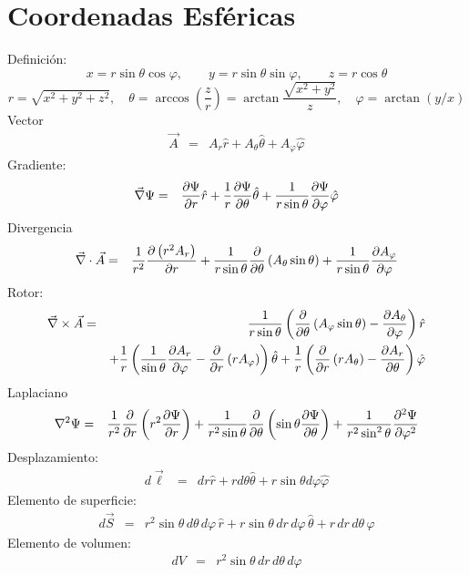 \section{Coordenadas Esféricas}
Definición:
\begin{equation}
 x = r\sin\theta\cos\varphi,\qquad 
 y = r\sin\theta\sin\varphi ,\qquad
 z = r\cos\theta 
\end{equation}
\begin{equation}
 r =\sqrt{x^2 + y^2 + z^2} ,\quad 
\theta =\arccos(\frac{z}{r}) =\arctan{\frac{\sqrt{x^2+y^2}}{z}},\quad
\varphi =\arctan{(y/x)} 
\end{equation}
Vector
\begin{eqnarray}
\vec{A} 
&=& A_r {\hat r} + A_\theta {\hat\theta} +
A_\varphi {\hat\varphi}
\end{eqnarray}
Gradiente:
\begin{eqnarray}
\vec\nabla\Psi
 &=& {\partial\Psi\over\partial r} {\hat r} 
 + {1\over r}{\partial\Psi\over\partial\theta} {\hat\theta} 
 + {1\over r\sin\theta}{\partial\Psi\over\partial\varphi} {\hat\varphi}
\end{eqnarray} 
Divergencia
\begin{eqnarray}
\vec\nabla\cdot\vec{A}
&=& {1\over r^2}{\partial\left( r^2 A_r\right)\over\partial r} 
 + {1\over r\sin\theta}{\partial\over\partial\theta}\left( 
A_\theta\sin\theta\right) 
 + {1\over r\sin\theta}{\partial A_\varphi\over\partial\varphi}
\end{eqnarray} 
Rotor:
\begin{eqnarray}
\vec\nabla\times\vec{A}
&=& {1\over r\sin\theta}\left({\partial\over\partial\theta}
\left( A_\varphi\sin\theta\right) - {\partial A_\theta\over\partial
\varphi}\right) {\hat r}\nonumber\\
&&+ {1\over r}\left({1\over\sin\theta}{\partial A_r\over\partial
\varphi} - {\partial\over\partial r}\left( r A_\varphi\right)\right)
 {\hat\theta} + {1\over r}\left({\partial\over\partial r}\left( r
A_\theta
\right) - {\partial A_r\over\partial\theta}\right) {\hat\varphi}
\end{eqnarray}
Laplaciano
\begin{eqnarray}
\nabla^2\Psi
&=& {1\over r^2}{\partial\over\partial r}\left(r^2 {\partial\Psi\over
\partial r}\right) + {1\over r^2\sin\theta}{\partial\over\partial
\theta}\left(\sin\theta {\partial\Psi\over\partial\theta}\right) 
 + {1\over r^2\sin^2\theta}{\partial^2\Psi\over\partial\varphi^2}
\end{eqnarray} 
Desplazamiento:
\begin{eqnarray}
 d\vec{\ell} 
&= & dr {\hat r} + rd\theta {\hat\theta} +r\sin\theta d\varphi {\hat\varphi}
\end{eqnarray} 
Elemento de superficie:
\begin{eqnarray}
 d\vec{S} 
&=& r^2\sin\theta\,d\theta\,d\varphi\, {\hat r} + r\sin\theta
\,dr\,d\varphi\, {\hat\theta} + r\,dr\,d\theta\, {\hat\varphi}
\end{eqnarray}
Elemento de volumen:
\begin{eqnarray}
 dV 
&=& r^2\sin\theta\,dr\,d\theta\, d\varphi
\end{eqnarray} 
